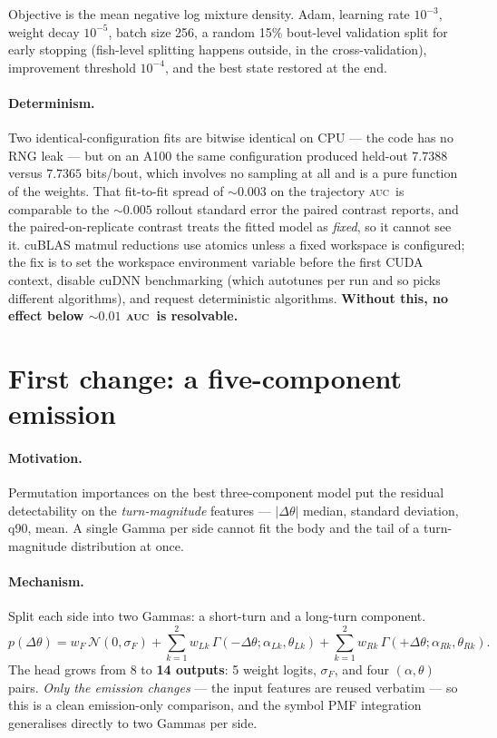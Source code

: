 \documentclass[11pt,a4paper]{article}
\newcommand{\dth}{\ensuremath{\Delta\theta}}
\newcommand{\auc}{\textsc{auc}}
\begin{document}
Objective is the mean negative log mixture density. Adam, learning rate $10^{-3}$, weight
decay $10^{-5}$, batch size 256, a random 15\% bout-level validation split for early
stopping (fish-level splitting happens outside, in the cross-validation), improvement
threshold $10^{-4}$, and the best state restored at the end.

\paragraph{Determinism.}
Two identical-configuration fits are bitwise identical on CPU --- the code has no RNG
leak --- but on an A100 the same configuration produced held-out $7.7388$ versus $7.7365$
bits/bout, which involves no sampling at all and is a pure function of the weights. That
fit-to-fit spread of $\sim0.003$ on the trajectory \auc\ is comparable to the $\sim0.005$
rollout standard error the paired contrast reports, and the paired-on-replicate contrast
treats the fitted model as \emph{fixed}, so it cannot see it. cuBLAS matmul reductions use
atomics unless a fixed workspace is configured; the fix is to set the workspace
environment variable before the first CUDA context, disable cuDNN benchmarking (which
autotunes per run and so picks different algorithms), and request deterministic
algorithms. \textbf{Without this, no effect below $\sim0.01$ \auc\ is resolvable.}

\section{First change: a five-component emission}\label{sec:mix}

\paragraph{Motivation.}
Permutation importances on the best three-component model put the residual detectability
on the \emph{turn-magnitude} features --- $|\dth|$ median, standard deviation, q90, mean.
A single Gamma per side cannot fit the body and the tail of a turn-magnitude distribution
at once.

\paragraph{Mechanism.}
Split each side into two Gammas: a short-turn and a long-turn component.
\begin{equation}
p(\dth) = w_F\,\mathcal{N}(0,\sigma_F)
 + \sum_{k=1}^{2} w_{Lk}\,\Gamma(-\dth;\alpha_{Lk},\theta_{Lk})
 + \sum_{k=1}^{2} w_{Rk}\,\Gamma(+\dth;\alpha_{Rk},\theta_{Rk}).
\end{equation}
The head grows from 8 to \textbf{14 outputs}: 5 weight logits, $\sigma_F$, and four
$(\alpha,\theta)$ pairs. \emph{Only the emission changes} --- the input features are
reused verbatim --- so this is a clean emission-only comparison, and the symbol PMF
integration generalises directly to two Gammas per side.
\end{document}
